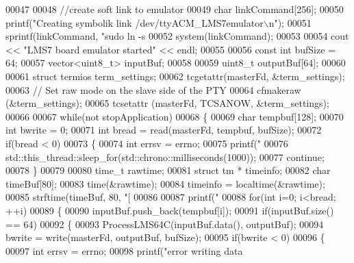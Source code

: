 \begin{DoxyCode}
{{00047 
00048     \textcolor{comment}{//create soft link to emulator}
00049     \textcolor{keywordtype}{char} linkCommand[256];
00050     printf(\textcolor{stringliteral}{"Creating symbolik link /dev/ttyACM\_LMS7emulator\(\backslash\)n"});
00051     sprintf(linkCommand, \textcolor{stringliteral}{"sudo ln -s %
00052     system(linkCommand);
00053 
00054     cout << \textcolor{stringliteral}{"LMS7 board emulator started"} << endl;
00055 
00056     \textcolor{keyword}{const} \textcolor{keywordtype}{int} bufSize = 64;
00057     vector<uint8\_t> inputBuf;
00058 
00059     uint8\_t outputBuf[64];
00060 
00061     \textcolor{keyword}{struct }termios term\_settings;
00062     tcgetattr(masterFd, &term\_settings);
00063     \textcolor{comment}{// Set raw mode on the slave side of the PTY}
00064     cfmakeraw (&term\_settings);
00065     tcsetattr (masterFd, TCSANOW, &term\_settings);
00066 
00067     \textcolor{keywordflow}{while}(not stopApplication)
00068     \{
00069         \textcolor{keywordtype}{char} tempbuf[128];
00070         \textcolor{keywordtype}{int} bwrite = 0;
00071         \textcolor{keywordtype}{int} bread = read(masterFd, tempbuf, bufSize);
00072         \textcolor{keywordflow}{if}(bread < 0)
00073         \{
00074             \textcolor{keywordtype}{int} errsv = errno;
00075             printf(\textcolor{stringliteral}{"%
00076             std::this\_thread::sleep\_for(std::chrono::milliseconds(1000));
00077             \textcolor{keywordflow}{continue};
00078         \}
00079 
00080         time\_t rawtime;
00081         \textcolor{keyword}{struct }tm * timeinfo;
00082         \textcolor{keywordtype}{char} timeBuf[80];
00083         time(&rawtime);
00084         timeinfo = localtime(&rawtime);
00085         strftime(timeBuf, 80, \textcolor{stringliteral}{"[%
00086 
00087         printf(\textcolor{stringliteral}{"%
00088         \textcolor{keywordflow}{for}(\textcolor{keywordtype}{int} i=0; i<bread; ++i)
00089         \{
00090             inputBuf.push\_back(tempbuf[i]);
00091             \textcolor{keywordflow}{if}(inputBuf.size() == 64)
00092             \{
00093                 ProcessLMS64C(inputBuf.data(), outputBuf);
00094                 bwrite = write(masterFd, outputBuf, bufSize);
00095                 \textcolor{keywordflow}{if}(bwrite < 0)
00096                 \{
00097                     \textcolor{keywordtype}{int} errsv = errno;
00098                     printf(\textcolor{stringliteral}{"error writing data %
}}}}}}}
\end{DoxyCode}
